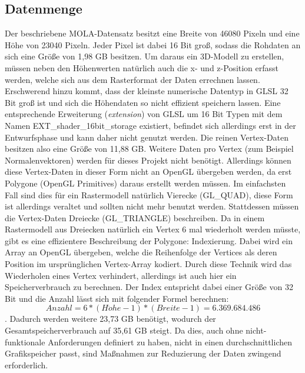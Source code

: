 \subsection{Datenmenge}\label{datenmenge}
Der beschriebene MOLA-Datensatz besitzt eine Breite von 46080 Pixeln und eine Höhe von 23040 Pixeln. Jeder Pixel ist dabei 16 Bit groß, sodass die Rohdaten an sich eine Größe von 1,98 GB besitzen\cite{molaDataExtended}. Um daraus ein 3D-Modell zu erstellen, müssen neben den Höhenwerten natürlich auch die x- und z-Position erfasst werden, welche sich aus dem Rasterformat der Daten errechnen lassen. Erschwerend hinzu kommt, dass der kleinste numerische Datentyp in GLSL 32 Bit groß ist\cite[Abschnitt 4.1]{glslSpec} und sich die Höhendaten so nicht effizient speichern lassen. Eine entsprechende Erweiterung (\textit{extension}) von GLSL um 16 Bit Typen mit dem Namen EXT\_shader\_16bit\_storage existiert, befindet sich allerdings erst in der Entwurfsphase und kann daher nicht genutzt werden. Die reinen Vertex-Daten besitzen also eine Größe von 11,88 GB. Weitere Daten pro Vertex (zum Beispiel Normalenvektoren) werden für dieses Projekt nicht benötigt. Allerdings können diese Vertex-Daten in dieser Form nicht an OpenGL übergeben werden, da erst Polygone (OpenGL Primitives) daraus erstellt werden müssen. Im einfachsten Fall sind dies für ein Rastermodell natürlich Vierecke (GL\_QUAD), diese Form ist allerdings veraltet und sollten nicht mehr benutzt werden. Stattdessen müssen die Vertex-Daten  Dreiecke (GL\_TRIANGLE) beschreiben. Da in einem Rastermodell aus Dreiecken natürlich ein Vertex 6 mal wiederholt werden müsste, gibt es eine effizientere Beschreibung der Polygone: Indexierung. Dabei wird ein Array an OpenGL übergeben, welche die Reihenfolge der Vertices als deren Position im ursprünglichen Vertex-Array kodiert. Durch diese Technik wird das Wiederholen eines Vertex verhindert, allerdings ist auch hier ein Speicherverbrauch zu berechnen. Der Index entspricht dabei einer Größe von 32 Bit und die Anzahl lässt sich mit folgender Formel berechnen: \[Anzahl = 6 * (H\ddot{o}he - 1) * (Breite - 1) = 6.369.684.486\]. Dadurch werden weitere 23,73 GB benötigt, wodurch der Gesamtspeicherverbrauch auf 35,61 GB steigt. Da dies, auch ohne nicht-funktionale Anforderungen definiert zu haben, nicht in einen durchschnittlichen Grafikspeicher passt, sind Maßnahmen zur Reduzierung der Daten zwingend erforderlich.


